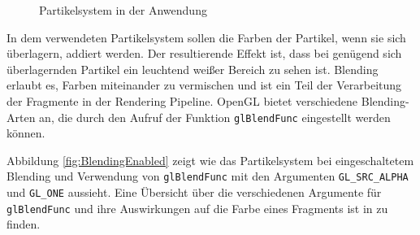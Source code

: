 \begin{figure}[b]
	\centering
	\vspace{1.5cm}%
	\vspace{-1.5cm}
	\caption{Partikelsystem in der Anwendung}
\end{figure}
In dem verwendeten Partikelsystem sollen die Farben der Partikel, wenn sie sich überlagern, addiert werden. Der resultierende Effekt ist, dass bei genügend sich überlagernden Partikel ein leuchtend weißer Bereich zu sehen ist. Blending erlaubt es, Farben miteinander zu vermischen und ist ein Teil der Verarbeitung der Fragmente in der Rendering Pipeline. OpenGL bietet verschiedene Blending-Arten an, die durch den Aufruf der Funktion {\texttt{glBlendFunc}} eingestellt werden können. 

Abbildung \ref{fig:BlendingEnabled} zeigt wie das Partikelsystem bei eingeschaltetem Blending und Verwendung von {\texttt{glBlendFunc}} mit den Argumenten {\texttt{GL\_SRC\_ALPHA}} und {\texttt{GL\_ONE}} aussieht. Eine Übersicht über die verschiedenen Argumente für {\texttt{glBlendFunc}} und ihre Auswirkungen auf die Farbe eines Fragments ist in \cite{virag:2012} zu finden.

